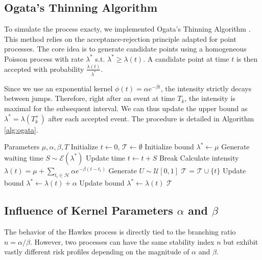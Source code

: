 \documentclass[a4paper,11pt]{article}
\begin{document}
\subsection{Ogata's Thinning Algorithm}
To simulate the process exacty, we implemented Ogata's Thinning Algorithm \cite{ogata1981}. This method relies on the acceptance-rejection principle adapted for point processes. The core idea is to generate candidate points using a homogeneous Poisson process with rate $\lambda^*$ s.t. $\lambda^* \ge \lambda(t)$. A candidate point at time $t$ is then accepted with probability $\frac{\lambda(t)}{\lambda^*}$.

Since we use an exponential kernel $\phi(t) = \alpha e^{-\beta t}$, the intensity strictly decays between jumps. Therefore, right after an event at time $T_k$, the intensity is maximal for the subsequent interval. We can thus update the upper bound as $\lambda^* = \lambda(T_k^+)$ after each accepted event. The procedure is detailed in Algorithm \ref{alg:ogata}.

\begin{algorithm}[H]
\caption{Ogata's Thinning Algorithm, adapted for Hawkes process with exponential kernel}
\label{alg:ogata}
\begin{algorithmic}[1]
\REQUIRE Parameters $\mu, \alpha, \beta, T$
\STATE Initialize $t \leftarrow 0$, $\mathcal{T} \leftarrow \emptyset$
\STATE Initialize bound $\lambda^* \leftarrow \mu$
    \STATE Generate waiting time $S \sim \mathcal{E}(\lambda^*)$
    \STATE Update time $t \leftarrow t + S$
     \STATE Break \ENDIF
    \STATE Calculate intensity $\lambda(t) = \mu + \sum_{t_i \in \mathcal{H}} \alpha e^{-\beta(t - t_i)}$
    \STATE Generate $U \sim \mathcal{U}[0, 1]$
        \STATE $\mathcal{T}$ = $\mathcal{T} \cup \{t\}$ \hfill {}
        \STATE Update bound $\lambda^* \leftarrow \lambda(t) + \alpha$
    \ELSE
        \STATE Update bound $\lambda^* \leftarrow \lambda(t)$ \hfill {}
    \ENDIF
\ENDWHILE
\RETURN $\mathcal{T}$
\end{algorithmic}
\end{algorithm}

\subsection{Influence of Kernel Parameters $\alpha$ and $\beta$}
The behavior of the Hawkes process is directly tied to the branching ratio $n = \alpha / \beta$. However, two processes can have the same stability index $n$ but exhibit vastly different risk profiles depending on the magnitude of $\alpha$ and $\beta$.
\end{document}
